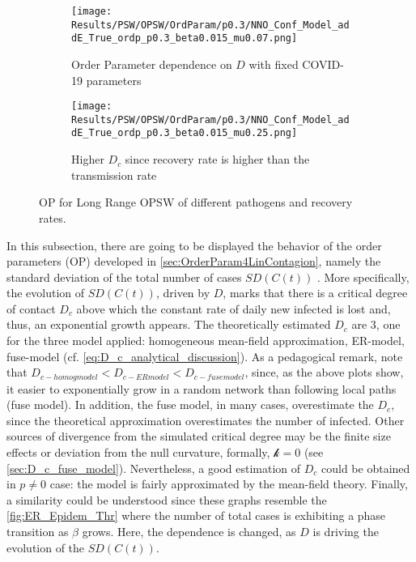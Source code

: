 \documentclass[a4paper,10pt,twoside]{book} %
\theoremstyle{definition}
\begin{document}
\begin{figure}[t]
	\begin{subfigure}{0.48\linewidth}
		\texttt{[image: Results/PSW/OPSW/OrdParam/p0.3/NNO\_Conf\_Model\_addE\_True\_ordp\_p0.3\_beta0.015\_mu0.07.png]}
		\caption{Order Parameter dependence on $D$ with fixed COVID-19 parameters}
		\label{fig:Ordp_OPSW_COVID-19_p0.3}
	\end{subfigure}
	\begin{subfigure}{0.48\linewidth}
		\texttt{[image: Results/PSW/OPSW/OrdParam/p0.3/NNO\_Conf\_Model\_addE\_True\_ordp\_p0.3\_beta0.015\_mu0.25.png]}
		\caption{Higher $D_c$ since recovery rate is higher than the transmission rate}
		\label{fig:Ordp_OPSW_highmu_p0.3}
	\end{subfigure}
	\caption{OP for Long Range OPSW of different pathogens and recovery rates.}
\end{figure}

In this subsection, there are going to be displayed the behavior of the order parameters (OP) developed in \autoref{sec:OrderParam4LinContagion}, namely the standard deviation of the total number of cases $SD(C(t))$ . More specifically, the evolution of $SD(C(t))$, driven by $D$, marks that there is a critical degree of contact $D_c$ above which the constant rate of daily new infected is lost and, thus, an exponential growth appears. The theoretically estimated $D_c$ are 3, one for the three model applied: homogeneous mean-field approximation, ER-model, fuse-model (cf. \autoref{eq:D_c_analytical_discussion}).
As a pedagogical remark, note that $D_{c-homog model} < D_{c-ER model} < D_{c-fuse model}$, since, as the above plots show, it easier to exponentially grow in a random network than following local paths (fuse model). In addition, the fuse model, in many cases, overestimate the $D_c$, since the theoretical approximation overestimates the number of infected. Other sources of divergence from the simulated critical degree may be the finite size effects or deviation from the null curvature, formally, $\mathcal{k} = 0$ (see \autoref{sec:D_c_fuse_model}). Nevertheless, a good estimation of $ D_c$ could be obtained in $ p \neq 0$ case: the model is fairly approximated by the mean-field theory.
Finally, a similarity could be understood since these graphs resemble the \autoref{fig:ER_Epidem_Thr} where the number of total cases is exhibiting a phase transition as $\beta$ grows. Here, the dependence is changed, as $D$ is driving the evolution of the $SD(C(t))$.
\end{document}
